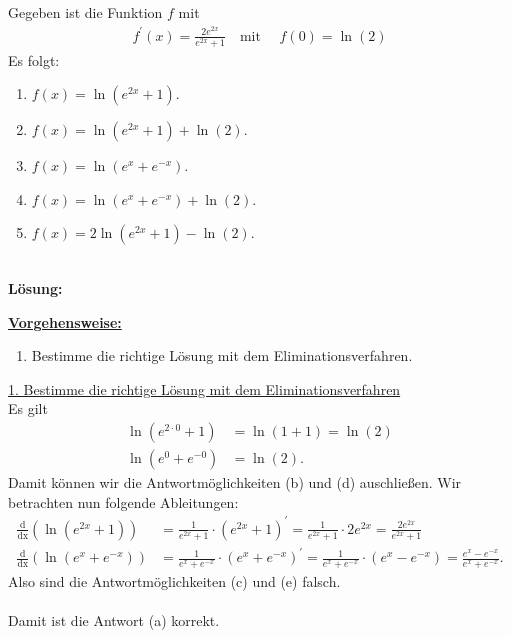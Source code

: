 \subsection*{}
Gegeben ist die Funktion $ f $ mit 
\begin{align*}
	f^\prime(x) = \frac{2 e^{2x}}{e^{2x} + 1} \quad \textrm{mit } \quad f(0) = \ln(2)
\end{align*}
Es folgt:
\renewcommand{\labelenumi}{(\alph{enumi})}
\begin{enumerate}
	\item 
	$f(x) = \ln(e^{2x} +1) $.
	\item
	$f(x) = \ln(e^{2x} +1) + \ln(2) $.
	\item
	$f(x) = \ln(e^{x} +e^{-x}) $.
	\item
	$f(x) = \ln(e^{x} +e^{-x}) + \ln(2) $.	
	\item
	$f(x) = 2 \ln(e^{2x} +1) - \ln(2) $.
\end{enumerate}
\ \\
\textbf{Lösung:}
\begin{mdframed}
\underline{\textbf{Vorgehensweise:}}
\renewcommand{\labelenumi}{\theenumi.}
\begin{enumerate}
\item Bestimme die richtige Lösung mit dem Eliminationsverfahren.
\end{enumerate}
\end{mdframed}

\underline{1. Bestimme die richtige Lösung mit dem Eliminationsverfahren}\\
Es gilt 
\begin{align*}
	\ln(e^{2\cdot 0} +1) &= \ln ( 1+ 1 ) = \ln (2)\\
	\ln(e^{0} + e^{-0})&= \ln(2).
\end{align*}
Damit können wir die Antwortmöglichkeiten (b) und (d) auschließen.
Wir betrachten nun folgende Ableitungen:
\begin{align*}
	\frac{\mathrm{d}}{\mathrm{dx}}
	\left(\ln(e^{2x} +1)\right)
	&=
	\frac{1}{e^{2x} +1} \cdot (e^{2x} +1)^\prime
	=
	\frac{1}{e^{2x} +1} \cdot 2 e^{2x}
	=
	\frac{ 2 e^{2x}}{e^{2x} +1}\\
	\frac{\mathrm{d}}{\mathrm{dx}}
	\left(\ln(e^{x} +e^{-x})\right)
	&=
	\frac{1}{e^{x} +e^{-x}} \cdot (e^{x} +e^{-x})^\prime
	=
	\frac{1}{e^{x} +e^{-x}} \cdot (e^x - e^{-x})
	=
	\frac{e^x - e^{-x}}{e^{x} +e^{-x}}.
\end{align*}
Also sind die Antwortmöglichkeiten (c) und (e) falsch.\\
\\
Damit ist die Antwort (a) korrekt.   

